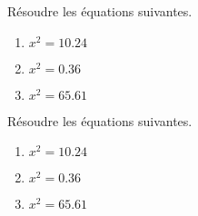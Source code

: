 \begin{exercice*}
    Résoudre  les équations suivantes.
    \begin{enumerate}
        \item $x^2=\num{10.24}$
        \item $x^2=\num{0.36}$
        \item $x^2=\num{65.61}$
    \end{enumerate}
\end{exercice*}
\begin{corrige}
    Résoudre les équations suivantes.

    \begin{enumerate}
        \item $x^2=\num{10.24}$
        
        \item $x^2=\num{0.36}$
        
        \item $x^2=\num{65.61}$
        
    \end{enumerate}
\end{corrige}
